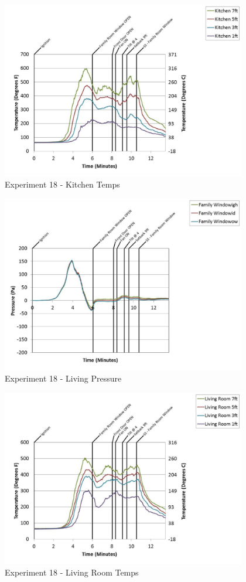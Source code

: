 \documentclass{article}
\begin{document}
\begin{appendices}
	\begin{figure}[h!]
		\centering
		\includegraphics[height=3.05in]{0_Images/Results_Charts/Exp_18_Charts/KitchenTemps.pdf}
		\caption{Experiment 18 - Kitchen Temps}
	\end{figure}
 
	\clearpage

	\begin{figure}[h!]
		\centering
		\includegraphics[height=3.05in]{0_Images/Results_Charts/Exp_18_Charts/LivingPressure.pdf}
		\caption{Experiment 18 - Living Pressure}
	\end{figure}
 

	\begin{figure}[h!]
		\centering
		\includegraphics[height=3.05in]{0_Images/Results_Charts/Exp_18_Charts/LivingRoomTemps.pdf}
		\caption{Experiment 18 - Living Room Temps}
	\end{figure}
 

\end{appendices}
\end{document}
